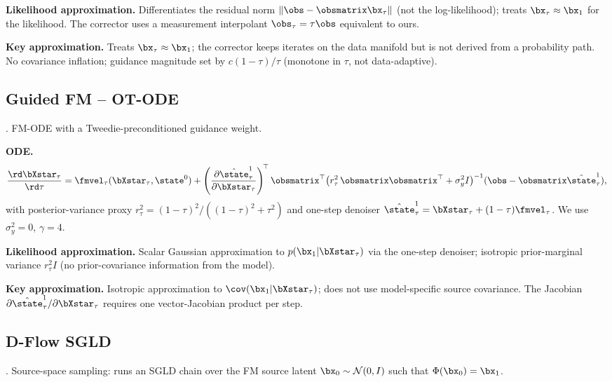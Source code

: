 \textbf{Likelihood approximation.}
Differentiates the residual norm $\|\obs-\obsmatrix\bx_\tau\|$ (not the log-likelihood); treats $\bx_\tau\approx\bx_1$ for the likelihood.
The corrector uses a measurement interpolant $\obs_\tau=\tau\obs$ equivalent to ours.

\textbf{Key approximation.}
Treats $\bx_\tau\approx\bx_1$; the corrector keeps iterates on the data manifold but is not derived from a probability path.
No covariance inflation; guidance magnitude set by $c(1-\tau)/\tau$ (monotone in $\tau$, not data-adaptive).

\subsection{Guided FM -- OT-ODE}\label{appendix:method:ot_ode}

\cite{pokle_training-free_2024}. FM-ODE with a Tweedie-preconditioned guidance weight.

\textbf{ODE.}
\begin{align}
  \frac{\rd\bXstar_\tau}{\rd\tau}
  = \fmvel_\tau(\bXstar_\tau,\state^0)
  + \left(\frac{\partial\hat{\state}^1_\tau}{\partial\bXstar_\tau}\right)^{\!\top}
    \obsmatrix^\top
    \bigl(r_\tau^2\,\obsmatrix\obsmatrix^\top + \sigma_y^2 I\bigr)^{-1}
    (\obs - \obsmatrix\hat{\state}^1_\tau),
\end{align}
with posterior-variance proxy $r_\tau^2 = (1-\tau)^2/((1-\tau)^2+\tau^2)$ and
one-step denoiser $\hat{\state}^1_\tau = \bXstar_\tau + (1-\tau)\fmvel_\tau$. We use $\sigma_y^2=0$, $\gamma=4$.

\textbf{Likelihood approximation.}
Scalar Gaussian approximation to $p(\bx_1|\bXstar_\tau)$ via the one-step denoiser; isotropic prior-marginal variance $r_\tau^2 I$ (no prior-covariance information from the model).

\textbf{Key approximation.}
Isotropic approximation to $\cov(\bx_1|\bXstar_\tau)$; does not use model-specific source covariance.
The Jacobian $\partial\hat{\state}^1_\tau/\partial\bXstar_\tau$ requires one vector-Jacobian product per step.

\subsection{D-Flow SGLD}\label{appendix:method:dflow}

\cite{parikh_d-flow_2026,ben-hamu_d-flow_2024}. Source-space sampling: runs an SGLD chain over the FM source latent $\bx_0\sim\mathcal{N}(0,I)$ such that $\Phi(\bx_0)=\bx_1$.

